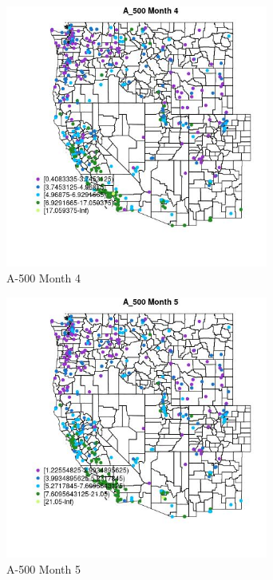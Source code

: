 \begin{figure} 
\centering  
\includegraphics[width=0.77\textwidth]{Code_Outputs/ML_input_report_ML_input_PM25_Step5_part_d_de_duplicated_aves_ML_input_MapObsMo4A_500.jpg} 
\caption{\label{fig:ML_input_report_ML_input_PM25_Step5_part_d_de_duplicated_aves_ML_inputMapObsMo4A_500}A-500 Month 4} 
\end{figure} 
 

\begin{figure} 
\centering  
\includegraphics[width=0.77\textwidth]{Code_Outputs/ML_input_report_ML_input_PM25_Step5_part_d_de_duplicated_aves_ML_input_MapObsMo5A_500.jpg} 
\caption{\label{fig:ML_input_report_ML_input_PM25_Step5_part_d_de_duplicated_aves_ML_inputMapObsMo5A_500}A-500 Month 5} 
\end{figure} 
 

